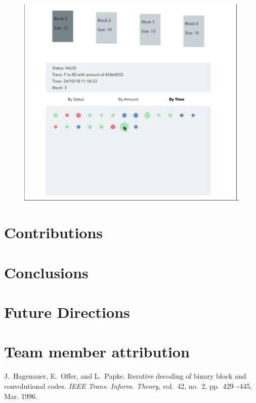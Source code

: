 \documentclass[journal, a4paper]{IEEEtran}
\begin{document}
\begin{figure}[!hbt]
		\begin{center}
		\includegraphics[width=\columnwidth]{block_hover.png}
		\caption{}
		\label{fig:block_hover}
		\end{center}
	\end{figure}
	
\section{Contributions}

\section{Conclusions}

\section{Future Directions}

\section{Team member attribution}

\begin{thebibliography}{5}

	J.~Hagenauer, E.~Offer, and L.~Papke. Iterative decoding of binary block
	and convolutional codes. {\em IEEE Trans. Inform. Theory},
	vol.~42, no.~2, pp.~429–-445, Mar. 1996.

\end{thebibliography}

\end{document}

